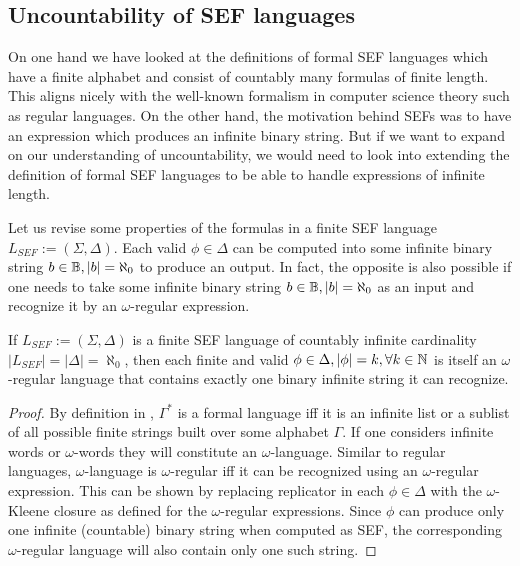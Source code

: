 \subsection{Uncountability of SEF languages}

On one hand we have looked at the definitions of formal SEF languages which have a finite alphabet and consist of countably many formulas of finite length. This aligns nicely with the well-known formalism in computer science theory such as regular languages. On the other hand, the motivation behind SEFs was to have an expression which produces an infinite binary string. But if we want to expand on our understanding of uncountability, we would need to look into extending the definition of formal SEF languages to be able to handle expressions of infinite length.

Let us revise some properties of the formulas in a finite SEF language $L_{SEF} := (\Sigma, \Delta)$. Each valid $\phi \in \Delta$ can be computed into some infinite binary string $b \in \mathbb{B}, |b| = \aleph_0$ to produce an output. In fact, the opposite is also possible if one needs to take some infinite binary string $b \in \mathbb{B}, |b| = \aleph_0$ as an input and recognize it by an $\omega$-regular expression\cite{Staiger1997}.

\begin{lemma}
  If $L_{SEF} := (\Sigma, \Delta)$ is a finite SEF language of countably infinite cardinality $|L_{SEF}| = |\Delta| = \aleph_0$, then each finite and valid $\phi \in \Delta, |\phi| = k, \forall k \in \mathbb{N}$ is itself an $\omega$-regular language that contains exactly one binary infinite string it can recognize.
\end{lemma}

\begin{proof}
  By definition in \cite{Sipser05introcompther}, $\Gamma^*$ is a formal language iff it is an infinite list or a sublist of all possible finite strings built over some alphabet $\Gamma$. If one considers infinite words or $\omega$-words they will constitute an $\omega$-language. Similar to regular languages, $\omega$-language is $\omega$-regular iff it can be recognized using an $\omega$-regular expression. This can be shown by replacing replicator in each $\phi \in \Delta$ with the $\omega$-Kleene closure as defined for the $\omega$-regular expressions. Since $\phi$ can produce only one infinite (countable) binary string when computed as SEF, the corresponding $\omega$-regular language will also contain only one such string.
\end{proof}

